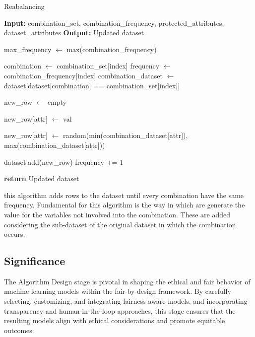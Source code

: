 \begin{algorithm}[H]
    \caption{Reabalancing}
    \begin{algorithmic}[1]
        \State \textbf{Input:} combination\_set, combination\_frequency, protected\_attributes, dataset\_attributes
        \State \textbf{Output:} Updated dataset

        \State max\_frequency $\gets$ max(combination\_frequency)

            \State combination $\gets$ combination\_set[index]
            \State frequency $\gets$ combination\_frequency[index]
            \State combination\_dataset $\gets$ dataset[dataset[combination] == combination\_set[index]]

                \State new\_row $\gets$ empty

                    \State new\_row[attr] $\gets$ val
                \EndFor

                    \State new\_row[attr] $\gets$ random(min(combination\_dataset[attr]), max(combination\_dataset[attr]))
                \EndFor

                \State dataset.add(new\_row)
                \State frequency $+$= 1
            \EndWhile
        \EndFor

        \State \textbf{return} Updated dataset
    \end{algorithmic}
\end{algorithm}

this algorithm adds rows to the dataset until every combination have the same frequency. Fundamental for this algorithm is the way in which are generate the value for the variables not involved into the combination. These are added considering the sub-dataset of the original dataset in which the combination occurs. 


\subsection{Significance}

The Algorithm Design stage is pivotal in shaping the ethical and fair behavior of machine learning models within the fair-by-design framework. By carefully selecting, customizing, and integrating fairness-aware models, and incorporating transparency and human-in-the-loop approaches, this stage ensures that the resulting models align with ethical considerations and promote equitable outcomes.

